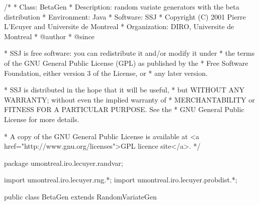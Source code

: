 \begin{code}
\begin{hide}
/*
 * Class:        BetaGen
 * Description:  random variate generators with the beta distribution
 * Environment:  Java
 * Software:     SSJ 
 * Copyright (C) 2001  Pierre L'Ecuyer and Universite de Montreal
 * Organization: DIRO, Universite de Montreal
 * @author       
 * @since

 * SSJ is free software: you can redistribute it and/or modify it under
 * the terms of the GNU General Public License (GPL) as published by the
 * Free Software Foundation, either version 3 of the License, or
 * any later version.

 * SSJ is distributed in the hope that it will be useful,
 * but WITHOUT ANY WARRANTY; without even the implied warranty of
 * MERCHANTABILITY or FITNESS FOR A PARTICULAR PURPOSE.  See the
 * GNU General Public License for more details.

 * A copy of the GNU General Public License is available at
   <a href="http://www.gnu.org/licenses">GPL licence site</a>.
 */
\end{hide}
package umontreal.iro.lecuyer.randvar;\begin{hide}
import umontreal.iro.lecuyer.rng.*;
import umontreal.iro.lecuyer.probdist.*;
\end{hide}

public class BetaGen extends RandomVariateGen \begin{hide} {
    
   // Distribution parameters
   protected double p;
   protected double q;
   protected double a;
   protected double b;
   protected int gen;
\end{hide}
\end{code}

